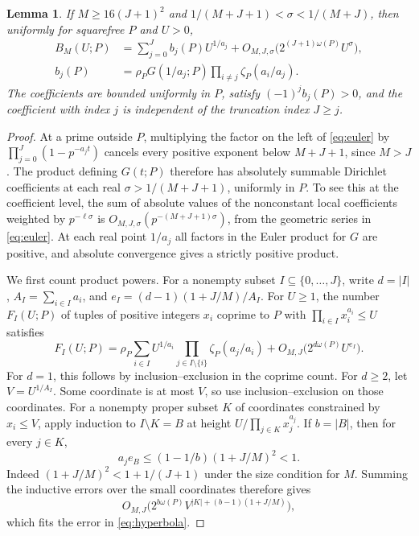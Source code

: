 \documentclass[11pt,reqno]{amsart}
\newtheorem{lemma}[theorem]{Lemma}
\begin{document}
\begin{lemma}\label{lem:single}
If \(M\ge16(J+1)^2\) and \(1/(M+J+1)<\sigma<1/(M+J)\), then uniformly
for squarefree \(P\) and \(U>0\),
\begin{align}
 B_M(U;P)&=\sum_{j=0}^J b_j(P)U^{1/a_j}
        +O_{M,J,\sigma}\bigl(2^{(J+1)\omega(P)}U^\sigma\bigr),\label{eq:one}\\
 b_j(P)&=\rho_P G(1/a_j;P)\prod_{i\ne j}\zeta_P(a_i/a_j).
 \label{eq:b}
\end{align}
The coefficients are bounded uniformly in \(P\), satisfy
\((-1)^j b_j(P)>0\), and the coefficient with index \(j\) is independent
of the truncation index \(J\ge j\).
\end{lemma}

\begin{proof}
At a prime outside \(P\), multiplying the factor on the left of
\eqref{eq:euler} by \(\prod_{j=0}^J(1-p^{-a_jt})\) cancels every
positive exponent below \(M+J+1\), since \(M>J\). The product defining
\(G(t;P)\) therefore has absolutely summable Dirichlet coefficients at
each real \(\sigma>1/(M+J+1)\), uniformly in \(P\). To see this at the
coefficient level, the sum of absolute values of the nonconstant local
coefficients weighted by \(p^{-\ell\sigma}\) is
\(O_{M,J,\sigma}(p^{-(M+J+1)\sigma})\), from the geometric series in
\eqref{eq:euler}. At each real point \(1/a_j\) all factors in the Euler
product for \(G\) are positive, and absolute convergence gives a strictly
positive product.

We first count product powers. For a nonempty subset \(I\subseteq
\{0,\ldots,J\}\), write \(d=|I|\), \(A_I=\sum_{i\in I}a_i\), and
\(e_I=(d-1)(1+J/M)/A_I\). For \(U\ge1\), the number \(F_I(U;P)\) of
tuples of positive integers \(x_i\) coprime to \(P\) with
\(\prod_{i\in I}x_i^{a_i}\le U\) satisfies
\begin{equation}\label{eq:hyperbola}
 F_I(U;P)=\rho_P\sum_{i\in I}U^{1/a_i}\prod_{j\in I\setminus\{i\}}
           \zeta_P(a_j/a_i)
      +O_{M,J}\bigl(2^{d\omega(P)}U^{e_I}\bigr).
\end{equation}
For \(d=1\), this follows by inclusion--exclusion in the coprime
count. For \(d\ge2\), let \(V=U^{1/A_I}\). Some coordinate is at most
\(V\), so use inclusion--exclusion on those coordinates. For a nonempty
proper subset \(K\) of coordinates constrained by \(x_i\le V\), apply
induction to \(I\setminus K=B\) at height \(U/\prod_{j\in K}x_j^{a_j}\).
If \(b=|B|\), then for every \(j\in K\),
\[
  a_j e_B\le (1-1/b)(1+J/M)^2<1.
\]
Indeed \((1+J/M)^2<1+1/(J+1)\) under the size condition for \(M\).
Summing the inductive errors over the small coordinates therefore gives
\[
 O_{M,J}\bigl(2^{b\omega(P)}V^{|K|+(b-1)(1+J/M)}\bigr),
\]
which fits the error in \eqref{eq:hyperbola}.


\end{proof}
\end{document}
